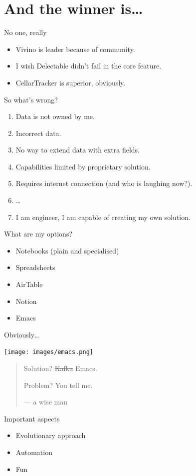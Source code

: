\documentclass[presentation,aspectratio=169,smaller]{beamer}
\begin{document}
\section{And the winner is\ldots{}}
\label{sec:orge6479ee}

\begin{frame}[label={sec:org43deb33}]{No one, really}
\begin{itemize}
\item Vivino is leader because of community.
\item I wish Delectable didn't fail in the core feature.
\item CellarTracker is superior, obviously.
\end{itemize}
\end{frame}
\begin{frame}[label={sec:org8911b9f}]{So what's wrong?}
\begin{enumerate}
\item Data is not owned by me.
\item Incorrect data.
\item No way to extend data with extra fields.
\item Capabilities limited by proprietary solution.
\item Requires internet connection (and who is laughing now?).
\item \ldots{}
\item I am engineer, I am capable of creating my own solution.
\end{enumerate}
\end{frame}
\begin{frame}[label={sec:org31039ba}]{What are my options?}
\begin{itemize}
\item Notebooks (plain and specialised)
\item Spreadsheets
\item AirTable
\item Notion
\item <2-> Emacs
\end{itemize}
\end{frame}
\begin{frame}[label={sec:org29c2817}]{Obviously\ldots{}}
\begin{center}
\texttt{[image: images/emacs.png]}
\end{center}

\begin{quote}
Solution? \sout{Kafka} Emacs.

Problem? You tell me.

--- a wise man
\end{quote}
\end{frame}
\begin{frame}[label={sec:org5e7ecaf}]{Important aspects}
\begin{itemize}
\item Evolutionary approach
\item Automation
\item Fun
\end{itemize}
\end{frame}
\end{document}
